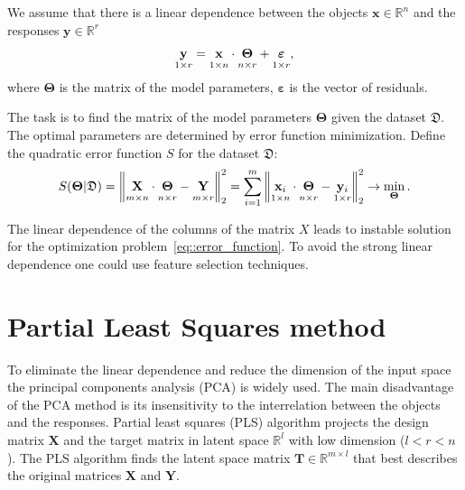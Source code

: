 \documentclass[12pt,twoside]{article}
\newcommand{\bx}{\mathbf{x}}
\newcommand{\by}{\mathbf{y}}
\newcommand{\bY}{\mathbf{Y}}
\newcommand{\bX}{\mathbf{X}}
\newcommand{\bT}{\mathbf{T}}
\newcommand{\bTheta}{\boldsymbol{\Theta}}
\begin{document}
We assume that there is a linear dependence between the objects $\bx \in \mathbb{R}^n$ and the responses $\by \in \mathbb{R}^r$
\begin{equation}
 \underset{1 \times r}{\by} = \underset{1 \times n}{\vphantom{\by}\bx} \cdot \underset{n \times r}{\vphantom{\by}\bTheta} + \underset{1 \times r}{\vphantom{\by}\boldsymbol{\varepsilon}}, 
\label{eq::model}
\end{equation}
where $\bTheta$ is the matrix of the model parameters, $\boldsymbol{\varepsilon}$ is the vector of residuals.

The task is to find the matrix of the model parameters $\bTheta$ given the dataset $\mathfrak{D}$.
The optimal parameters are determined by error function minimization. 
Define the quadratic error function $S$ for the dataset $\mathfrak{D}$:
\begin{equation}
	S(\bTheta | \mathfrak{D}) = {\left\| \underset{m \times n}{\vphantom{\by}\mathbf{X}} \cdot \underset{n \times r}{\vphantom{\by}\bTheta} - \underset{m \times r}{\vphantom{\by}\mathbf{Y}} \right\| }_2^2 = \sum_{i=1}^m \left\| \underset{1 \times n}{\vphantom{\by}\bx_i} \cdot \underset{n \times r}{\vphantom{\by}\bTheta} - \underset{1 \times r}{\vphantom{\by}\by_i} \right\|_2^2 \rightarrow\min_{\bTheta}.
\label{eq::error_function}
\end{equation}
 
 The linear dependence of the columns of the matrix $X$ leads to instable solution for the optimization problem~\eqref{eq::error_function}. 
 To avoid the strong linear dependence one could use feature selection techniques.

\section{Partial Least Squares method}

To eliminate the linear dependence and reduce the dimension of the input space the principal components analysis (PCA) is widely used. 
The main disadvantage of the PCA method is its insensitivity to the interrelation between the objects and the responses.
Partial least squares (PLS) algorithm projects the design matrix $\bX$ and the target matrix in latent space $\mathbb{R}^l$ with low dimension ($l < r < n$).
The PLS algorithm finds the latent space matrix $\bT \in \mathbb{R}^{m \times l}$ that best describes the original matrices $\bX$ and $\bY$.
\end{document}
